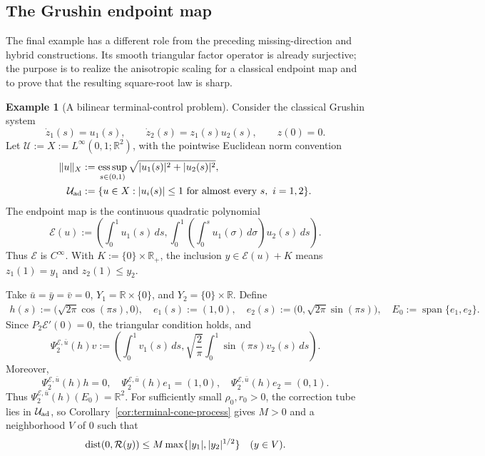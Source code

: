 \documentclass[11pt]{amsart}
\theoremstyle{definition}
\newtheorem{example}[theorem]{Example}
\theoremstyle{remark}
\newcommand{\R}{\mathbb R}
\newcommand{\dist}{\mathop{\rm dist}\nolimits}
\begin{document}
	\subsection{The Grushin endpoint map}
	
	The final example has a different role from the preceding missing-direction
	and hybrid constructions. Its smooth triangular factor operator is already
	surjective; the purpose is to realize the anisotropic scaling for a classical
	endpoint map and to prove that the resulting square-root law is sharp.
	
	\begin{example}[A bilinear terminal-control problem]
		\label{ex:bilinear-terminal-control}
		Consider the classical Grushin system
		$$
		\dot z_1(s)=u_1(s),\qquad
		\dot z_2(s)=z_1(s)u_2(s),\qquad z(0)=0.
		$$
		Let $\mathcal U:=X:=L^\infty(0,1;\R^2)$, with the pointwise Euclidean
		norm convention
		$$
		\begin{aligned}
			\|u\|_X
			&:=\mathop{\rm ess\,sup}_{s\in(0,1)}
			\sqrt{|u_1(s)|^2+|u_2(s)|^2},\\
			\mathcal U_{\rm ad}
			&:=\{u\in X:|u_i(s)|\le1
			\text{ for almost every }s,\ i=1,2\}.
		\end{aligned}
		$$
		The endpoint map is the continuous quadratic polynomial
		$$
		\mathcal E(u):=\left(
		\int_0^1u_1(s)\,ds,
		\int_0^1\!\left(\int_0^su_1(\sigma)\,d\sigma\right)u_2(s)\,ds
		\right).
		$$
		Thus $\mathcal E$ is $C^\infty$.  With
		$K:=\{0\}\times\R_+$, the inclusion
		$y\in\mathcal E(u)+K$ means
		$z_1(1)=y_1$ and $z_2(1)\le y_2$.
		
		Take $\bar u=\bar y=\bar v=0$,
		$Y_1=\R\times\{0\}$, and $Y_2=\{0\}\times\R$.  Define
		$$
		\begin{aligned}
			h(s):=\bigl(\sqrt{2\pi}\cos(\pi s),0\bigr),\quad
			e_1(s):=(1,0),\quad
			e_2(s):=\bigl(0,\sqrt{2\pi}\sin(\pi s)\bigr),\quad
			E_0:=\operatorname{span}\{e_1,e_2\}.
		\end{aligned}
		$$
		Since $P_2\mathcal E'(0)=0$, the triangular condition holds, and
		$$
		\Psi_2^{\mathcal E,\bar u}(h)v:=
		\left(
		\int_0^1v_1(s)\,ds,
		\sqrt{\frac{2}{\pi}}
		\int_0^1\sin(\pi s)v_2(s)\,ds
		\right).
		$$
		Moreover,
		$$
		\Psi_2^{\mathcal E,\bar u}(h)h=0,\quad
		\Psi_2^{\mathcal E,\bar u}(h)e_1=(1,0),
		\quad \Psi_2^{\mathcal E,\bar u}(h)e_2=(0,1).
		$$
		Thus $\Psi_2^{\mathcal E,\bar u}(h)(E_0)=\R^2$. For sufficiently small
		$\rho_0,r_0>0$, the correction tube lies in
		$\mathcal U_{\rm ad}$, so Corollary~\ref{cor:terminal-cone-process}
		gives $M>0$ and a neighborhood $V$ of $0$ such that
		$$
		\dist(0,\mathcal R(y))
		\le M\max\{|y_1|,|y_2|^{1/2}\}
		\quad (y\in V).
		$$
		

\end{example}
\end{document}
